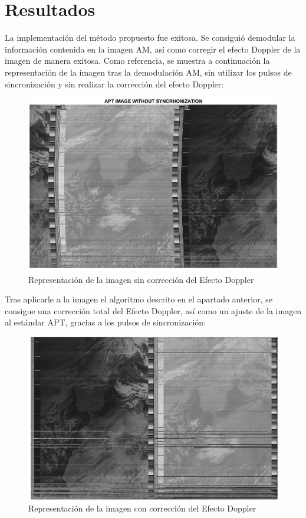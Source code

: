 \documentclass[a4paper,openright,12pt]{article}
\begin{document}
\section{Resultados}

La implementación del método propuesto fue exitosa. Se consiguió demodular la información contenida en la imagen AM, así como corregir el efecto Doppler de la imagen de manera exitosa. Como referencia, se muestra a continuación la representación de la imagen tras la demodulación AM, sin utilizar los pulsos de sincronización y sin realizar la corrección del efecto Doppler:


 \begin{figure}[H]
 \centering
 \includegraphics[width = 13cm]{imagenes/31_01_nosynch.png}
 \caption{Representación de la imagen sin corrección del Efecto Doppler}
 \label{apt_nosynch}
 \end{figure}
 
 Tras aplicarle a la imagen el algoritmo descrito en el apartado anterior, se consigue una corrección total del Efecto Doppler, así como un ajuste de la imagen al estándar APT, gracias a los pulsos de sincronización:

 \begin{figure}[H]
 \centering
 \includegraphics[width = 13cm]{imagenes/31_01_synch.png}
 \caption{Representación de la imagen con corrección del Efecto Doppler}
 \label{apt_corrected}
 \end{figure}
 
\end{document}
